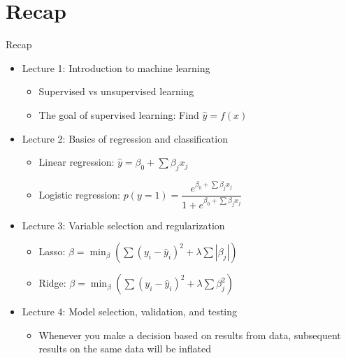 \section{Recap}

\begin{frame}{Recap}
    \begin{itemize}
        \item Lecture 1: Introduction to machine learning
        \begin{itemize}
            \item Supervised vs unsupervised learning
            \item The goal of supervised learning: Find $\hat{y}=f(x)$
        \end{itemize}
        \item Lecture 2: Basics of regression and classification
        \begin{itemize}
            \item Linear regression: $\hat{y}=\beta_0+\sum \beta_jx_j$
            \item Logistic regression: $p(y=1)=\dfrac{e^{\beta_0+\sum \beta_jx_j}}{1+e^{\beta_0+\sum \beta_jx_j}}$
        \end{itemize}
        \item Lecture 3: Variable selection and regularization
        \begin{itemize}
            \item Lasso: $\displaystyle \beta=\min_{\beta}\left(\sum(y_i-\hat{y}_i)^2+\lambda\sum|\beta_j|\right)$
            \item Ridge: $\displaystyle \beta=\min_{\beta}\left(\sum(y_i-\hat{y}_i)^2+\lambda\sum \beta_j^2 \right)$
        \end{itemize}
        \item Lecture 4: Model selection, validation, and testing
        \begin{itemize}
            \item Whenever you make a decision based on results from data, subsequent results on the same data will be inflated
        \end{itemize}
    \end{itemize}
\end{frame}
